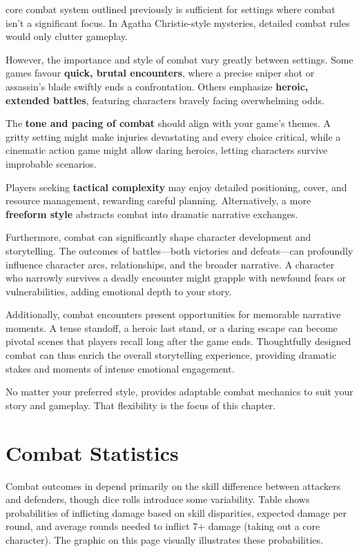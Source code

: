 

 core combat system outlined previously is sufficient for settings where combat isn’t a significant focus. In Agatha Christie-style mysteries, detailed combat rules would only clutter gameplay.

However, the importance and style of combat vary greatly between settings. Some games favour \textbf{quick, brutal encounters}, where a precise sniper shot or assassin’s blade swiftly ends a confrontation. Others emphasize \textbf{heroic, extended battles}, featuring characters bravely facing overwhelming odds.

The \textbf{tone and pacing of combat} should align with your game’s themes. A gritty setting might make injuries devastating and every choice critical, while a cinematic action game might allow daring heroics, letting characters survive improbable scenarios.

Players seeking \textbf{tactical complexity} may enjoy detailed positioning, cover, and resource management, rewarding careful planning. Alternatively, a more \textbf{freeform style} abstracts combat into dramatic narrative exchanges.

Furthermore, combat can significantly shape character development and storytelling. The outcomes of battles—both victories and defeats—can profoundly influence character arcs, relationships, and the broader narrative. A character who narrowly survives a deadly encounter might grapple with newfound fears or vulnerabilities, adding emotional depth to your story.

Additionally, combat encounters present opportunities for memorable narrative moments. A tense standoff, a heroic last stand, or a daring escape can become pivotal scenes that players recall long after the game ends. Thoughtfully designed combat can thus enrich the overall storytelling experience, providing dramatic stakes and moments of intense emotional engagement.

No matter your preferred style, \wyrd provides adaptable combat mechanics to suit your story and gameplay. That flexibility is the focus of this chapter.



\section{Combat Statistics}

Combat outcomes in \wyrd depend primarily on the skill difference between attackers and defenders, though dice rolls introduce some variability. Table  shows probabilities of inflicting damage based on skill disparities, expected damage per round, and average rounds needed to inflict 7+ damage (taking out a core character). The graphic on this page visually illustrates these probabilities.

